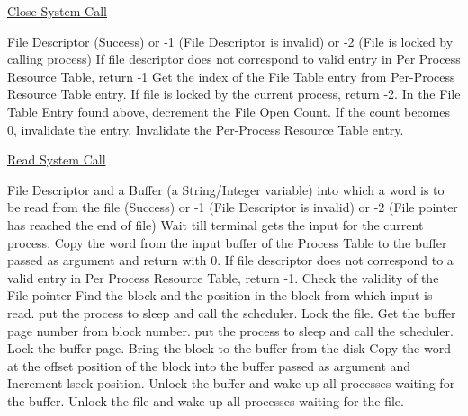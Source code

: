 
\begin{algorithm}
\caption{\href{http://exposnitc.github.io/os_design-files/close.html}{Close System Call}}
\begin{algorithmic}
\REQUIRE File Descriptor
 (Success) or -1 (File Descriptor is invalid) or -2 (File is locked by calling process)
\STATE If file descriptor does not correspond to valid entry in Per Process Resource Table, return -1   
\STATE Get the index of the File Table entry from Per-Process Resource Table entry.
\STATE If file is locked by the current process, return -2.   
\STATE In the File Table Entry found above, decrement the File Open Count. If the count becomes 0, invalidate the entry.  
\STATE Invalidate the Per-Process Resource Table entry.    
\end{algorithmic}
\end{algorithm}


\begin{algorithm}
\caption{\href{http://exposnitc.github.io/os_design-files/read.html}{Read System Call}}
\begin{algorithmic}
\REQUIRE File Descriptor and a Buffer (a String/Integer variable) into which a word is to be read from the file
 (Success) or -1 (File Descriptor is invalid) or -2 (File pointer has reached the end of file)
    \STATE Wait till terminal gets the input for the current process.
    \STATE Copy the word from the input buffer of the Process Table to the buffer passed as argument and return with 0. 
\ENDIF
\STATE If file descriptor does not correspond to a valid entry in Per Process Resource Table, return -1.
\STATE Check the validity of the File pointer
\STATE Find the block and the position in the block from which input is read.
    \STATE put the process to sleep and call the scheduler.
\ENDWHILE
\STATE Lock the file.
\STATE Get the buffer page number from block number.
    \STATE put the process to sleep and call the scheduler.
\ENDWHILE 
\STATE Lock the buffer page.
    \STATE Bring the block to the buffer from the disk
\ENDIF 
\STATE Copy the word at the offset position of the block into the buffer passed as argument and Increment lseek position.
\STATE Unlock the buffer and wake up all processes waiting for the buffer.
\STATE Unlock the file and wake up all processes waiting for the file.
\end{algorithmic}
\end{algorithm}

